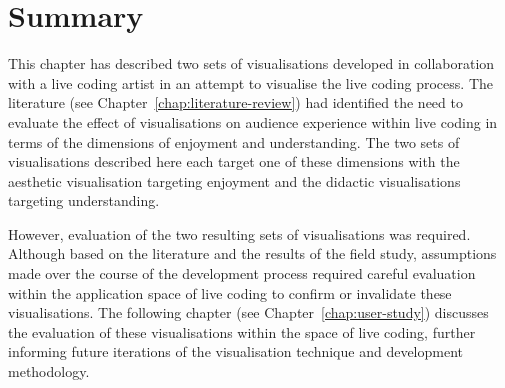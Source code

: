 


\section{Summary}

This chapter has described two sets of visualisations developed in collaboration with a live coding artist in an attempt to visualise the live coding process. The literature (see Chapter~\ref{chap:literature-review}) had identified the need to evaluate the effect of visualisations on audience experience within live coding in terms of the dimensions of enjoyment and understanding. The two sets of visualisations described here each target one of these dimensions with the aesthetic visualisation targeting enjoyment and the didactic visualisations targeting understanding. 

However, evaluation of the two resulting sets of visualisations was required. Although based on the literature and the results of the field study, assumptions made over the course of the development process required careful evaluation within the application space of live coding to confirm or invalidate these visualisations. The following chapter (see Chapter~\ref{chap:user-study}) discusses the evaluation of these visualisations within the space of live coding, further informing future iterations of the visualisation technique and development methodology.



